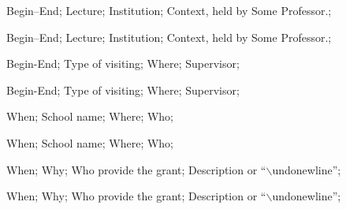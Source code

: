 \addteaching%
{%
    Begin--End;%
    Lecture;%
    Institution;%
    Context, held by Some Professor.;%
}%

\addteaching%
{%
    Begin--End;%
    Lecture;%
    Institution;%
    Context, held by Some Professor.;%
}%


\addvisit%
{%
    Begin-End;%
    Type of visiting;%
    Where;%
    Supervisor;%
}%

\addvisit%
{%
    Begin-End;%
    Type of visiting;%
    Where;%
    Supervisor;%
}%

\addschool%
{%
    When;%
    School name;%
    Where;%
    Who;%
}%

\addschool%
{%
    When;%
    School name;%
    Where;%
    Who;%
}%

\addhonour%
{%
    When;%
    Why;%
    Who provide the grant;%
    Description or ``$\backslash$undonewline'';%
}%

\addhonour%
{%
    When;%
    Why;%
    Who provide the grant;%
    Description or ``$\backslash$undonewline'';%
}%
